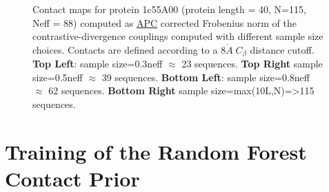 \documentclass[11pt,a4paper,twoside]{book}
\newcommand{\Cb}{C_\beta}
\newcommand{\angstrom}{\mathring{A} \;}
\theoremstyle{definition}
\theoremstyle{definition}
\theoremstyle{remark}
\begin{document}
\begin{figure}
{}

\caption{Contact maps for
protein 1c55A00 (protein length = 40, N=115, Neff = 88) computed as
\protect\hyperlink{abbrev}{APC} corrected Frobenius norm of the
contrastive-divergence couplings computed with different sample size
choices. Contacts are defined according to a \(8 \angstrom \Cb\)
distance cutoff. \textbf{Top Left}: sample size=0.3neff \(\approx\) 23
sequences. \textbf{Top Right} sample size=0.5neff \(\approx\) 39
sequences. \textbf{Bottom Left}: sample size=0.8neff \(\approx\) 62
sequences. \textbf{Bottom Right} sample
size=max(10L,N)=\textgreater{}115 sequences.}\label{fig:contactmaps-1c55a00-different-samplesize}
\end{figure}

\chapter{Training of the Random Forest Contact
Prior}\label{training-of-the-random-forest-contact-prior}
\end{document}
